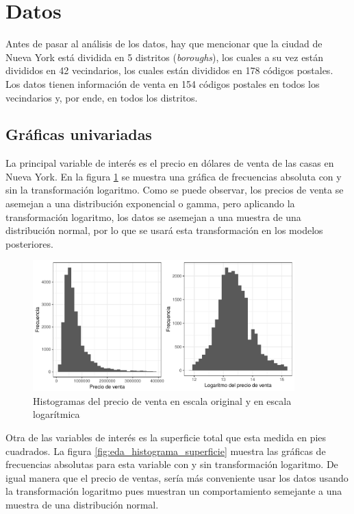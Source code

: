 
\section{Datos}
\label{sec:datos}

Antes de pasar al análisis de los datos, hay que mencionar que la ciudad de Nueva York está dividida en 5 distritos (\textit{boroughs}), los cuales a su vez están divididos en 42 vecindarios, los cuales están divididos en 178 códigos postales. Los datos tienen información de venta en 154 códigos postales en todos los vecindarios y, por ende, en todos los distritos.

\subsection{Gráficas univariadas}

La principal variable de interés es el precio en dólares de venta de las casas en Nueva York. En la figura \ref{fig:eda_histograma_precio_venta} se muestra una gráfica de frecuencias absoluta con y sin la transformación logaritmo. Como se puede observar, los precios de venta se asemejan a una distribución exponencial o gamma, pero aplicando la transformación logaritmo, los datos se asemejan a una muestra de una distribución normal, por lo que se usará esta transformación en los modelos posteriores.

\begin{figure}[H]
    \centering
    \includegraphics[width=0.9\textwidth]{images/eda_histograma_precio_venta.pdf}
    \caption{Histogramas del precio de venta en escala original y en escala logarítmica}
    \label{fig:eda_histograma_precio_venta}
\end{figure}


Otra de las variables de interés es la superficie total que esta medida en pies cuadrados. La figura \ref{fig:eda_histograma_superficie} muestra las gráficas de frecuencias absolutas para esta variable con y sin transformación logaritmo. De igual manera que el precio de ventas, sería más conveniente usar los datos usando la transformación logaritmo pues muestran un comportamiento semejante a una muestra de una distribución normal.

